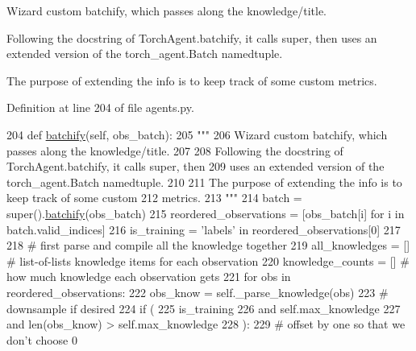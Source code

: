 \begin{DoxyVerb}Wizard custom batchify, which passes along the knowledge/title.

Following the docstring of TorchAgent.batchify, it calls super, then
uses an extended version of the torch_agent.Batch namedtuple.

The purpose of extending the info is to keep track of some custom
metrics.
\end{DoxyVerb}
 

Definition at line 204 of file agents.\+py.


\begin{DoxyCode}
204     \textcolor{keyword}{def }\hyperlink{namespaceparlai_1_1agents_1_1drqa_1_1utils_aca22dd97c5b6dcda2a7479c1cb22ef1e}{batchify}(self, obs\_batch):
205         \textcolor{stringliteral}{"""}
206 \textcolor{stringliteral}{        Wizard custom batchify, which passes along the knowledge/title.}
207 \textcolor{stringliteral}{}
208 \textcolor{stringliteral}{        Following the docstring of TorchAgent.batchify, it calls super, then}
209 \textcolor{stringliteral}{        uses an extended version of the torch\_agent.Batch namedtuple.}
210 \textcolor{stringliteral}{}
211 \textcolor{stringliteral}{        The purpose of extending the info is to keep track of some custom}
212 \textcolor{stringliteral}{        metrics.}
213 \textcolor{stringliteral}{        """}
214         batch = super().\hyperlink{namespaceparlai_1_1agents_1_1drqa_1_1utils_aca22dd97c5b6dcda2a7479c1cb22ef1e}{batchify}(obs\_batch)
215         reordered\_observations = [obs\_batch[i] \textcolor{keywordflow}{for} i \textcolor{keywordflow}{in} batch.valid\_indices]
216         is\_training = \textcolor{stringliteral}{'labels'} \textcolor{keywordflow}{in} reordered\_observations[0]
217 
218         \textcolor{comment}{# first parse and compile all the knowledge together}
219         all\_knowledges = []  \textcolor{comment}{# list-of-lists knowledge items for each observation}
220         knowledge\_counts = []  \textcolor{comment}{# how much knowledge each observation gets}
221         \textcolor{keywordflow}{for} obs \textcolor{keywordflow}{in} reordered\_observations:
222             obs\_know = self.\_parse\_knowledge(obs)
223             \textcolor{comment}{# downsample if desired}
224             \textcolor{keywordflow}{if} (
225                 is\_training
226                 \textcolor{keywordflow}{and} self.max\_knowledge
227                 \textcolor{keywordflow}{and} len(obs\_know) > self.max\_knowledge
228             ):
229                 \textcolor{comment}{# offset by one so that we don't choose 0}

\end{DoxyCode}
